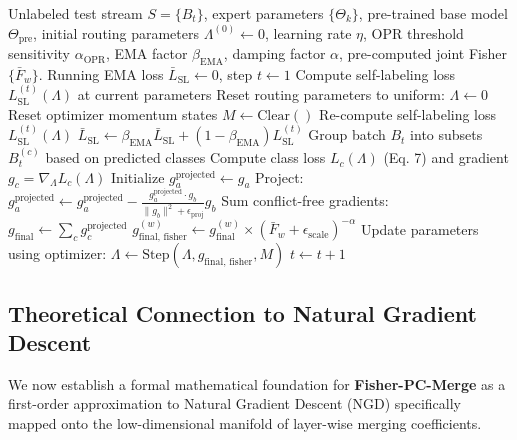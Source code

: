 \documentclass{article}
\theoremstyle{plain}
\theoremstyle{definition}
\theoremstyle{remark}
\begin{document}
\begin{algorithm}[tb]
\caption{Fisher-PC-Merge}
\label{alg:fisher_pc_merge}
\footnotesize
\begin{algorithmic}[1]
    Unlabeled test stream $S = \{B_t\}$, expert parameters $\{\Theta_k\}$, pre-trained base model $\Theta_{\text{pre}}$, initial routing parameters $\Lambda^{(0)} \leftarrow 0$, learning rate $\eta$, OPR threshold sensitivity $\alpha_{\text{OPR}}$, EMA factor $\beta_{\text{EMA}}$, damping factor $\alpha$, pre-computed joint Fisher $\{\bar{F}_w\}$.
    Running EMA loss $\bar{L}_{\text{SL}} \leftarrow 0$, step $t \leftarrow 1$
   \STATE Compute self-labeling loss $L_{\text{SL}}^{(t)}(\Lambda)$ at current parameters
   \STATE Reset routing parameters to uniform: $\Lambda \leftarrow 0$
   \STATE Reset optimizer momentum states $M \leftarrow \text{Clear}()$
   \STATE Re-compute self-labeling loss $L_{\text{SL}}^{(t)}(\Lambda)$
   \ENDIF
    $\bar{L}_{\text{SL}} \leftarrow \beta_{\text{EMA}} \bar{L}_{\text{SL}} + (1 - \beta_{\text{EMA}}) L_{\text{SL}}^{(t)}$
   \STATE Group batch $B_t$ into subsets $B_t^{(c)}$ based on predicted classes
   \STATE Compute class loss $L_c(\Lambda)$ (Eq. 7) and gradient $g_c = \nabla_{\Lambda} L_c(\Lambda)$
   \ENDFOR
   \STATE Initialize $g_a^{\text{projected}} \leftarrow g_a$
   \STATE Project: $g_a^{\text{projected}} \leftarrow g_a^{\text{projected}} - \frac{g_a^{\text{projected}} \cdot g_b}{\|g_b\|^2 + \epsilon_{\text{proj}}} g_b$
   \ENDIF
   \ENDFOR
   \ENDFOR
   \STATE Sum conflict-free gradients: $g_{\text{final}} \leftarrow \sum_c g_c^{\text{projected}}$
   \STATE $g_{\text{final, fisher}}^{(w)} \leftarrow g_{\text{final}}^{(w)} \times (\bar{F}_w + \epsilon_{\text{scale}})^{-\alpha}$
   \ENDFOR
   \STATE Update parameters using optimizer: $\Lambda \leftarrow \text{Step}(\Lambda, g_{\text{final, fisher}}, M)$
   \STATE $t \leftarrow t + 1$
   \ENDFOR
\end{algorithmic}
\end{algorithm}

\subsection{Theoretical Connection to Natural Gradient Descent}
We now establish a formal mathematical foundation for \textbf{Fisher-PC-Merge} as a first-order approximation to Natural Gradient Descent (NGD) \cite{zhang_fast_2019, jnini_dual_2025} specifically mapped onto the low-dimensional manifold of layer-wise merging coefficients.
\end{document}
